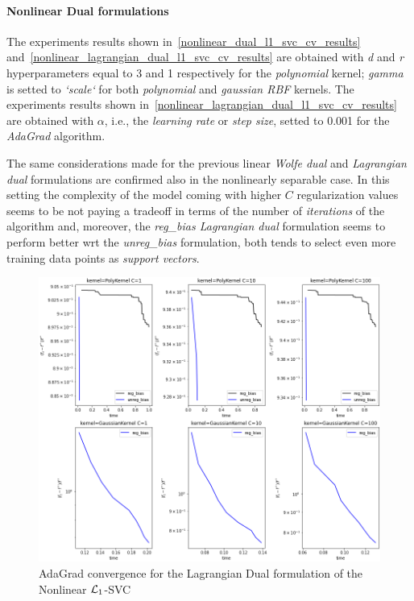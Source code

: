 \paragraph{Nonlinear Dual formulations}

The experiments results shown in~\ref{nonlinear_dual_l1_svc_cv_results} and~\ref{nonlinear_lagrangian_dual_l1_svc_cv_results} are obtained with \emph{d} and \emph{r} hyperparameters equal to 3 and 1 respectively for the \emph{polynomial} kernel; \emph{gamma} is setted to \emph{`scale`} for both \emph{polynomial} and \emph{gaussian RBF} kernels. The experiments results shown in~\ref{nonlinear_lagrangian_dual_l1_svc_cv_results} are obtained with $\alpha$, i.e., the \emph{learning rate} or \emph{step size}, setted to 0.001 for the \emph{AdaGrad} algorithm.





The same considerations made for the previous linear \emph{Wolfe dual} and \emph{Lagrangian dual} formulations are confirmed also in the nonlinearly separable case. In this setting the complexity of the model coming with higher $C$ regularization values seems to be not paying a tradeoff in terms of the number of \emph{iterations} of the algorithm and, moreover, the \emph{reg\_bias Lagrangian dual} formulation seems to perform better wrt the \emph{unreg\_bias} formulation, both tends to select even more training data points as \emph{support vectors}.

\begin{figure}[H]
	\centering
	\includegraphics[scale=0.55]{img/lagrangian_dual_l1_svc_loss_history}
	\caption{AdaGrad convergence for the Lagrangian Dual formulation of the Nonlinear $\protect \mathcal{L}_1$-SVC}
	\label{fig:lagrangian_dual_l1_svc_loss_history}
\end{figure}


